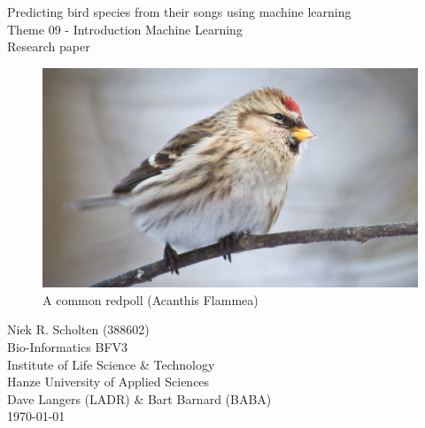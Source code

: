 \documentclass[
]{article}
\author{}
\date{\vspace{-2.5em}}
\begin{document}

\begin{center}

    \Huge{Predicting bird species from their songs using machine learning}\\
    \vspace{\baselineskip}
    \LARGE{Theme 09 - Introduction Machine Learning}\\
    \large{Research paper}\\
    \vspace{\baselineskip}

    \begin{figure}
        \centering\includegraphics[width=\linewidth]{Acanthis_flammea}
        \caption{A common redpoll (Acanthis Flammea)}
        \label{fig:Acanthis_flammea}
    \end{figure}

\end{center}
\vspace{\baselineskip}

\normalsize
\vspace*{\fill}
\begin{flushright}
    Niek R. Scholten (388602)\\
    Bio-Informatics BFV3\\
    Institute of Life Science \& Technology\\
    Hanze University of Applied Sciences\\
    Dave Langers (LADR) \& Bart Barnard (BABA)\\
    \today
\end{flushright}
\newpage

\null
\thispagestyle{empty}
\addtocounter{page}{-1}
\newpage
\end{document}
